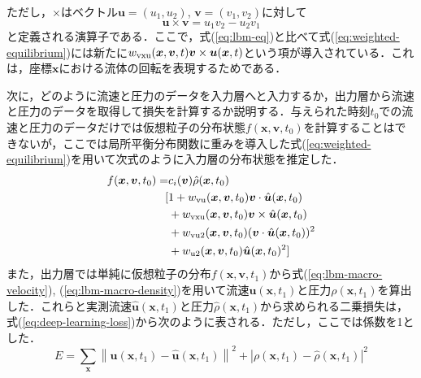ただし，$\times$はベクトル$\bm{u} = (u_1, u_2)$, $\bm{v} = (v_1, v_2)$に対して
\begin{equation}
  \bm{u} \times \bm{v} = u_1 v_2 - u_2 v_1
  \label{eq:cross-product}
\end{equation}
と定義される演算子である．ここで，式(\ref{eq:lbm-eq})と比べて式(\ref{eq:weighted-equilibrium})には新たに$w_{\rm{vxu}}(\bm{x}, \bm{v}, t)\bm{v} \times \bm{u}(\bm{x}, t)$という項が導入されている．これは，座標$\bm{x}$における流体の回転を表現するためである．

次に，どのように流速と圧力のデータを入力層へと入力するか，出力層から流速と圧力のデータを取得して損失を計算するか説明する．与えられた時刻$t_0$での流速と圧力のデータだけでは仮想粒子の分布状態$f(\bm{x}, \bm{v}, t_0)$を計算することはできないが，ここでは局所平衡分布関数に重みを導入した式(\ref{eq:weighted-equilibrium})を用いて次式のように入力層の分布状態を推定した．
\begin{equation}
  \begin{split}
  f(\bm{x}, \bm{v}, t_0) = 
  &c_i(\bm{v}) \hat{\rho}(\bm{x}, t_0) \\ [ 
    &1 
    + w_{\rm{vu}}(\bm{x}, \bm{v}, t_0)\bm{v} \cdot \hat{\bm{u}}(\bm{x}, t_0) \\
    &+ w_{\rm{vxu}}(\bm{x}, \bm{v}, t_0)\bm{v} \times \hat{\bm{u}}(\bm{x}, t_0) \\
    &+ w_{\rm{vu2}}(\bm{x}, \bm{v}, t_0)(\bm{v} \cdot \hat{\bm{u}}(\bm{x}, t_0))^2 \\
    &+ w_{\rm{u2}}(\bm{x}, \bm{v}, t_0)\hat{\bm{u}}(\bm{x}, t_0)^2 
  ]
  \end{split}
  \label{eq:input-layer}
\end{equation}
また，出力層では単純に仮想粒子の分布$f(\bm{x}, \bm{v}, t_1)$から式(\ref{eq:lbm-macro-velocity}), (\ref{eq:lbm-macro-density})を用いて流速$\bm{u}(\bm{x}, t_1)$と圧力$\rho(\bm{x}, t_1)$を算出した．これらと実測流速$\hat{\bm{u}}(\bm{x}, t_1)$と圧力$\hat{\rho}(\bm{x}, t_1)$から求められる二乗損失は，式(\ref{eq:deep-learning-loss})から次のように表される．ただし，ここでは係数を1とした．
\begin{equation}
  E = \sum_{\bm{x}} 
  \left\| \bm{u}(\bm{x}, t_1) - \hat{\bm{u}}(\bm{x}, t_1) \right\|^2 +
  \left| \rho(\bm{x}, t_1) - \hat{\rho}(\bm{x}, t_1) \right|^2
  \label{eq:error-function}
\end{equation}

